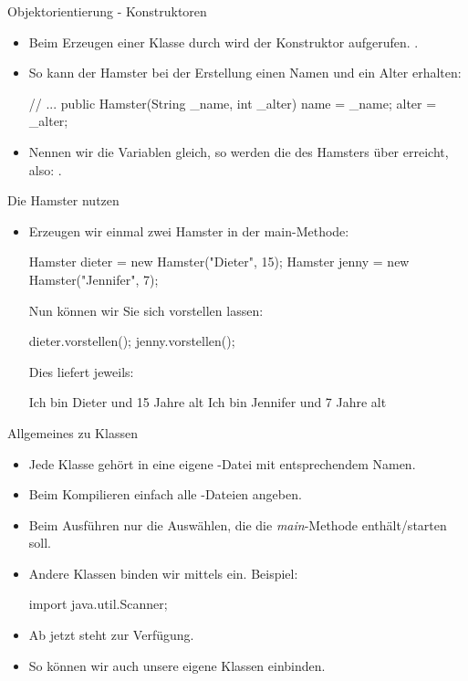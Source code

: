 \begin{frame}[t,fragile]{Objektorientierung - Konstruktoren}
    \begin{itemize}[<+(1)->]
        \item Beim Erzeugen einer Klasse durch  wird der Konstruktor aufgerufen.\pause{} .
        \item So kann der Hamster bei der Erstellung einen Namen und ein Alter erhalten:\pause{}
\begin{java}[morekeywords={[2]{Hamster}}]
// ...
public Hamster(String _name, int _alter) {
    name = _name;
    alter = _alter;
}
\end{java}
        \item Nennen wir die Variablen gleich, so werden die des Hamsters über  erreicht,\pause{} also: .
    \end{itemize}
\end{frame}

\begin{frame}[t,fragile]{Die Hamster nutzen~\,\smaller\Smiley}
    \begin{itemize}[<+(1)->]
        \item Erzeugen wir einmal zwei Hamster in der main-Methode:\pause{}
\begin{java}[morekeywords={[2]{Hamster}}]
Hamster dieter = new Hamster("Dieter", 15);
Hamster jenny  = new Hamster("Jennifer", 7);
\end{java}
        \pause{}Nun können wir Sie sich vorstellen lassen:\pause
\begin{java}[morekeywords={[6]{vorstellen}}]
dieter.vorstellen();
jenny.vorstellen();
\end{java}
        \pause{}Dies liefert jeweils:\pause{}
        \begin{plainvoid}
Ich bin Dieter und 15 Jahre alt
Ich bin Jennifer und 7 Jahre alt
        \end{plainvoid}
    \end{itemize}
\end{frame}

\begin{frame}[t,fragile]{Allgemeines zu Klassen}
    \begin{itemize}[<+(1)->]
        \item Jede Klasse gehört in eine eigene -Datei mit entsprechendem Namen.
        \item Beim Kompilieren einfach alle -Dateien angeben.
        \item Beim Ausführen nur die Auswählen, die die \emph{main}-Methode enthält/starten soll.
        \item Andere Klassen binden wir mittels  ein.\pause{} Beispiel: \pause{}
\begin{java*}
import java.util.Scanner;
\end{java*}
        \item Ab jetzt steht  zur Verfügung.
        \item So können wir auch unsere eigene Klassen einbinden.
    \end{itemize}
\end{frame}

